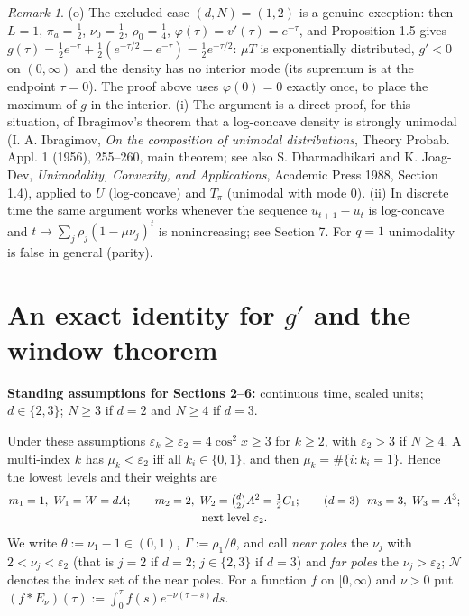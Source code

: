 \documentclass[11pt,a4paper]{article}
\theoremstyle{definition}
\theoremstyle{remark}
\newtheorem{remark}[theorem]{Remark}
\begin{document}
\begin{remark}
(o) The excluded case $(d,N)=(1,2)$ is a genuine exception: then $L=1$, $\pi_a=\frac12$, $\nu_0=\frac12$, $\rho_0=\frac14$, $\varphi(\tau)=v'(\tau)=e^{-\tau}$, and Proposition 1.5 gives $g(\tau)=\frac12e^{-\tau}+\frac12(e^{-\tau/2}-e^{-\tau})=\frac12e^{-\tau/2}$: $\mu T$ is exponentially distributed, $g'<0$ on $(0,\infty)$ and the density has no interior mode (its supremum is at the endpoint $\tau=0$). The proof above uses $\varphi(0)=0$ exactly once, to place the maximum of $g$ in the interior. (i) The argument is a direct proof, for this situation, of Ibragimov's theorem that a log-concave density is strongly unimodal (I. A. Ibragimov, \emph{On the composition of unimodal distributions}, Theory Probab. Appl. 1 (1956), 255–260, main theorem; see also S. Dharmadhikari and K. Joag-Dev, \emph{Unimodality, Convexity, and Applications}, Academic Press 1988, Section 1.4), applied to $U$ (log-concave) and $T_\pi$ (unimodal with mode $0$). (ii) In discrete time the same argument works whenever the sequence $u_{t+1}-u_t$ is log-concave and $t\mapsto\sum_j\rho_j(1-\mu\nu_j)^{t}$ is nonincreasing; see Section 7. For $q=1$ unimodality is false in general (parity).
\end{remark}

\setcounter{section}{1}
\section{An exact identity for $g'$ and the window theorem}

\textbf{Standing assumptions for Sections 2–6:} continuous time, scaled units; $d\in\{2,3\}$; $N\ge3$ if $d=2$ and $N\ge4$ if $d=3$.

Under these assumptions $\varepsilon_k\ge\varepsilon_2=4\cos^2x\ge3$ for $k\ge2$, with $\varepsilon_2>3$ if $N\ge4$. A multi-index $k$ has $\mu_k<\varepsilon_2$ iff all $k_i\in\{0,1\}$, and then $\mu_k=\#\{i:k_i=1\}$. Hence the lowest levels and their weights are
\begin{gather*}
m_1=1,\ W_1=W=dA; \qquad m_2=2,\ W_2=\tbinom d2A^2=\tfrac12C_1; \qquad (d=3)\ \ m_3=3,\ W_3=A^3; \\
\text{next level }\varepsilon_2 .
\end{gather*}
We write $\theta:=\nu_1-1\in(0,1)$, $\Gamma:=\rho_1/\theta$, and call \emph{near poles} the $\nu_j$ with $2<\nu_j<\varepsilon_2$ (that is $j=2$ if $d=2$; $j\in\{2,3\}$ if $d=3$) and \emph{far poles} the $\nu_j>\varepsilon_2$; $\mathcal N$ denotes the index set of the near poles. For a function $f$ on $[0,\infty)$ and $\nu>0$ put $(f*E_\nu)(\tau):=\int_0^\tau f(s)e^{-\nu(\tau-s)}ds$.
\end{document}
